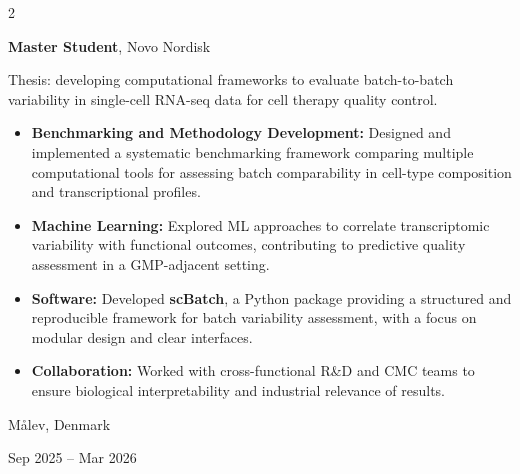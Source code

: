 \documentclass[10pt, letterpaper]{article}
\newenvironment{highlights}{
    \begin{itemize}[
        topsep=0.10 cm,
        parsep=0.10 cm,
        partopsep=0pt,
        itemsep=0pt,
        leftmargin=0.4 cm + 10pt
    ]
}{
    \end{itemize}
} %
\newenvironment{twocolentry}[2][]{
    \onecolentry
    \def\secondColumn{#2}
    \setcolumnwidth{\fill, 4.5 cm}
    \begin{paracol}{2}
}{
    \switchcolumn \raggedleft \secondColumn
    \end{paracol}
    \endonecolentry
} %
\begin{document}
        \begin{twocolentry}{
    Målev, Denmark

    Sep 2025 -- Mar 2026
}
    \textbf{Master Student}, Novo Nordisk

    \vspace{0.1cm}

    Thesis: developing computational frameworks to evaluate batch-to-batch variability in single-cell RNA-seq data for cell therapy quality control.

    \begin{highlights}
        \item \textbf{Benchmarking and Methodology Development:} Designed and implemented a systematic benchmarking framework comparing multiple computational tools for assessing batch comparability in cell-type composition and transcriptional profiles.

        \vspace{0.1cm}

        \item \textbf{Machine Learning:} Explored ML approaches to correlate transcriptomic variability with functional outcomes, contributing to predictive quality assessment in a GMP-adjacent setting.

        \vspace{0.1cm}

        \item \textbf{Software:} Developed \textbf{scBatch}, a Python package providing a structured and reproducible framework for batch variability assessment, with a focus on modular design and clear interfaces.

        \vspace{0.1cm}

        \item \textbf{Collaboration:} Worked with cross-functional R\&D and CMC teams to ensure biological interpretability and industrial relevance of results.
    \end{highlights}
\end{twocolentry}

        \vspace{0.3 cm}
\end{document}
